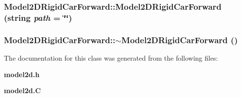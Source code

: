\subsubsection{\setlength{\rightskip}{0pt plus 5cm}Model2DRigid\-Car\-Forward::Model2DRigid\-Car\-Forward (string {\em path} = \char`\"{}\char`\"{})}\label{classModel2DRigidCarForward_a0}


\subsubsection{\setlength{\rightskip}{0pt plus 5cm}Model2DRigid\-Car\-Forward::$\sim$Model2DRigid\-Car\-Forward ()\hspace{0.3cm}{\tt  [inline, virtual]}}\label{classModel2DRigidCarForward_a1}




The documentation for this class was generated from the following files:\begin{CompactItemize}
\item 
{\bf model2d.h}\item 
{\bf model2d.C}\end{CompactItemize}
